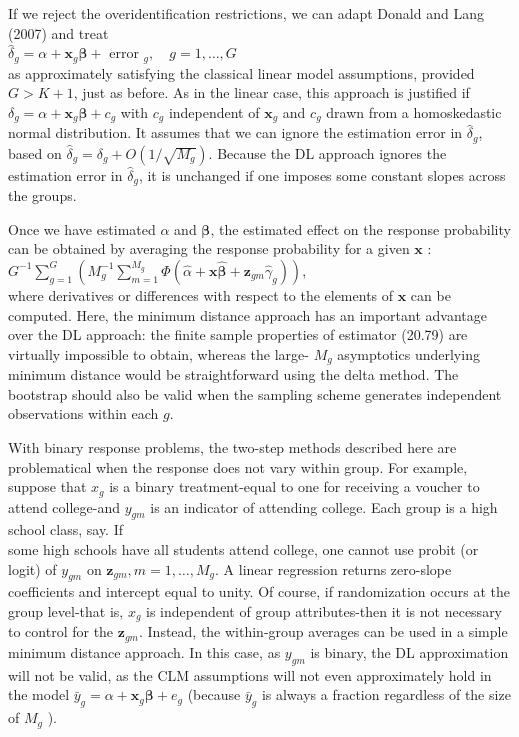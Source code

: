 \documentclass[10pt]{article}
\begin{document}
If we reject the overidentification restrictions, we can adapt Donald and Lang (2007) and treat\\
$\hat{\delta}_{g}=\alpha+\mathbf{x}_{g} \boldsymbol{\beta}+$ error $_{g}, \quad g=1, \ldots, G$\\
as approximately satisfying the classical linear model assumptions, provided $G> K+1$, just as before. As in the linear case, this approach is justified if $\delta_{g}=\alpha+\mathbf{x}_{g} \boldsymbol{\beta}+ c_{g}$ with $c_{g}$ independent of $\mathbf{x}_{g}$ and $c_{g}$ drawn from a homoskedastic normal distribution. It assumes that we can ignore the estimation error in $\hat{\delta}_{g}$, based on $\hat{\delta}_{g}=\delta_{g}+ O\left(1 / \sqrt{M_{g}}\right)$. Because the DL approach ignores the estimation error in $\hat{\delta}_{g}$, it is unchanged if one imposes some constant slopes across the groups.

Once we have estimated $\alpha$ and $\boldsymbol{\beta}$, the estimated effect on the response probability can be obtained by averaging the response probability for a given $\mathbf{x}$ :\\
$G^{-1} \sum_{g=1}^{G}\left(M_{g}^{-1} \sum_{m=1}^{M_{g}} \Phi\left(\hat{\alpha}+\mathbf{x} \hat{\boldsymbol{\beta}}+\mathbf{z}_{g m} \hat{\gamma}_{g}\right)\right)$,\\
where derivatives or differences with respect to the elements of $\mathbf{x}$ can be computed. Here, the minimum distance approach has an important advantage over the DL approach: the finite sample properties of estimator (20.79) are virtually impossible to obtain, whereas the large- $M_{g}$ asymptotics underlying minimum distance would be straightforward using the delta method. The bootstrap should also be valid when the sampling scheme generates independent observations within each $g$.

With binary response problems, the two-step methods described here are problematical when the response does not vary within group. For example, suppose that $x_{g}$ is a binary treatment-equal to one for receiving a voucher to attend college-and $y_{g m}$ is an indicator of attending college. Each group is a high school class, say. If\\
some high schools have all students attend college, one cannot use probit (or logit) of $y_{g m}$ on $\mathbf{z}_{g m}, m=1, \ldots, M_{g}$. A linear regression returns zero-slope coefficients and intercept equal to unity. Of course, if randomization occurs at the group level-that is, $x_{g}$ is independent of group attributes-then it is not necessary to control for the $\mathbf{z}_{g m}$. Instead, the within-group averages can be used in a simple minimum distance approach. In this case, as $y_{g m}$ is binary, the DL approximation will not be valid, as the CLM assumptions will not even approximately hold in the model $\bar{y}_{g}=\alpha+\mathbf{x}_{g} \boldsymbol{\beta}+ e_{g}$ (because $\bar{y}_{g}$ is always a fraction regardless of the size of $M_{g}$ ).
\end{document}
